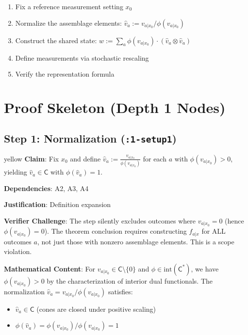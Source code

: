 \documentclass[11pt,a4paper]{article}
\theoremstyle{definition}
\newcommand{\C}{\mathsf{C}}
\newcommand{\Cstar}{\mathsf{C}^*}
\newcommand{\interior}{\mathrm{int}}
\begin{document}
\begin{enumerate}
    \item Fix a reference measurement setting $x_0$
    \item Normalize the assemblage elements: $\hat{v}_a := v_{a|x_0}/\phi(v_{a|x_0})$
    \item Construct the shared state: $w := \sum_a \phi(v_{a|x_0}) \cdot (\hat{v}_a \otimes \hat{v}_a)$
    \item Define measurements via stochastic rescaling
    \item Verify the representation formula
\end{enumerate}

\section{Proof Skeleton (Depth 1 Nodes)}

\subsection{Step 1: Normalization (\texttt{:1-setup1})}

\begin{statusbox}{yellow}
\textbf{Claim}: Fix $x_0$ and define $\hat{v}_a := \frac{v_{a|x_0}}{\phi(v_{a|x_0})}$ for each $a$ with $\phi(v_{a|x_0}) > 0$, yielding $\hat{v}_a \in \C$ with $\phi(\hat{v}_a) = 1$.

\textbf{Dependencies}: A2, A3, A4

\textbf{Justification}: Definition expansion
\end{statusbox}

\begin{challengebox}
\textbf{Verifier Challenge}: The step silently excludes outcomes where $v_{a|x_0} = 0$ (hence $\phi(v_{a|x_0}) = 0$). The theorem conclusion requires constructing $f_{a|x}$ for ALL outcomes $a$, not just those with nonzero assemblage elements. This is a scope violation.
\end{challengebox}

\textbf{Mathematical Content}: For $v_{a|x_0} \in \C \setminus \{0\}$ and $\phi \in \interior(\Cstar)$, we have $\phi(v_{a|x_0}) > 0$ by the characterization of interior dual functionals. The normalization $\hat{v}_a = v_{a|x_0}/\phi(v_{a|x_0})$ satisfies:
\begin{itemize}
    \item $\hat{v}_a \in \C$ (cones are closed under positive scaling)
    \item $\phi(\hat{v}_a) = \phi(v_{a|x_0})/\phi(v_{a|x_0}) = 1$
\end{itemize}
\end{document}
